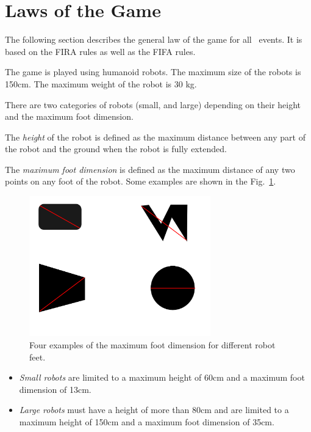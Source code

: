 \documentclass[12pt]{hurocup}
\begin{document}
\section{Laws of the Game}
\label{sec:laws}

The following section describes the general law of the game for all
\HuroCup\  events. It is based on the FIRA rules as well as the FIFA
rules. 

\label{law:players}

\begin{lawlist}[G]
\item \label{humanoid} The game is played using humanoid robots. The
  maximum size of the robots is 150cm. The maximum weight of the robot
  is 30 kg.
\item \label{categories} There are two categories of robots (small,
and large) depending on their height and the maximum foot
dimension. 

The \emph{height} of the robot is defined as the maximum distance
between any part of the robot and the ground when the robot is fully
extended.

The \emph{maximum foot dimension} is defined as the maximum
distance of any two points on any foot of the robot. Some
examples are shown in the Fig.~\ref{fig:foot-dimension}.

  \begin{figure}
    \begin{center}
      \includegraphics[width=0.7\textwidth]{Figures/foot-dimension}
    \end{center}
    \caption{Four examples of the maximum foot dimension for different
     robot feet.}
    \label{fig:foot-dimension}
  \end{figure}

  \begin{itemize}
    \item \emph{Small robots} are limited to a maximum height of 60cm
       and a maximum foot dimension of 13cm.
    \item \emph{Large robots} must have a height of more than 80cm and
    are limited to a maximum height of 150cm and a maximum foot
    dimension of 35cm.  
  \end{itemize}


\end{lawlist}
\end{document}
